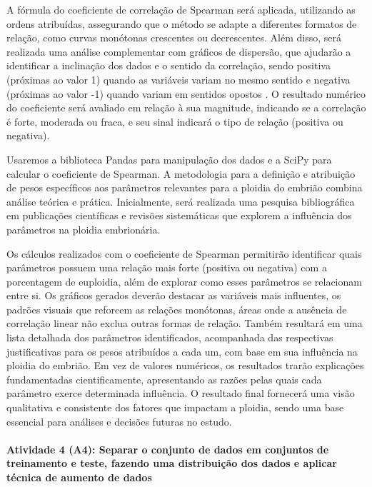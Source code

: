 A fórmula do coeficiente de correlação de Spearman será aplicada, utilizando as ordens atribuídas, assegurando que o método se adapte a diferentes formatos de relação, como curvas monótonas crescentes ou decrescentes. Além disso, será realizada uma análise complementar com gráficos de dispersão, que ajudarão a identificar a inclinação dos dados e o sentido da correlação, sendo positiva (próximas ao valor 1) quando as variáveis variam no mesmo sentido e negativa (próximas ao valor -1) quando variam em sentidos opostos \cite{sousa2019}. O resultado numérico do coeficiente será avaliado em relação à sua magnitude, indicando se a correlação é forte, moderada ou fraca, e seu sinal indicará o tipo de relação (positiva ou negativa). 

Usaremos a biblioteca Pandas para manipulação dos dados e a SciPy para calcular o coeficiente de Spearman. A metodologia para a definição e atribuição de pesos específicos aos parâmetros relevantes para a ploidia do embrião combina análise teórica e prática. Inicialmente, será realizada uma pesquisa bibliográfica em publicações científicas e revisões sistemáticas que explorem a influência dos parâmetros na ploidia embrionária.

Os cálculos realizados com o coeficiente de Spearman permitirão identificar quais parâmetros possuem uma relação mais forte (positiva ou negativa) com a porcentagem de euploidia, além de explorar como esses parâmetros se relacionam entre si. Os gráficos gerados deverão destacar as variáveis mais influentes, os padrões visuais que reforcem as relações monótonas, áreas onde a ausência de correlação linear não exclua outras formas de relação. Também resultará em uma lista detalhada dos parâmetros identificados, acompanhada das respectivas justificativas para os pesos atribuídos a cada um, com base em sua influência na ploidia do embrião. Em vez de valores numéricos, os resultados trarão explicações fundamentadas cientificamente, apresentando as razões pelas quais cada parâmetro exerce determinada influência. O resultado final fornecerá uma visão qualitativa e consistente dos fatores que impactam a ploidia, sendo uma base essencial para análises e decisões futuras no estudo.

\paragraph{\textbf{Atividade 4 (A4):} Separar o conjunto de dados em conjuntos de treinamento e teste, fazendo uma distribuição dos dados e aplicar técnica de aumento de dados}

